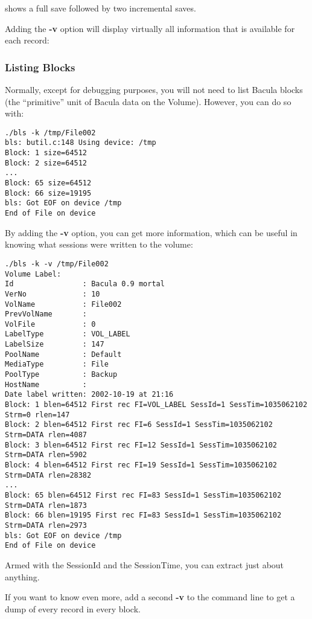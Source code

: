 shows a full save followed by two incremental saves. 

Adding the {\bf -v} option will display virtually all information that is
available for each record: 

\subsubsection*{Listing Blocks}

Normally, except for debugging purposes, you will not need to list Bacula
blocks (the ``primitive'' unit of Bacula data on the Volume). However, you can
do so with: 

\footnotesize
\begin{verbatim}
./bls -k /tmp/File002
bls: butil.c:148 Using device: /tmp
Block: 1 size=64512
Block: 2 size=64512
...
Block: 65 size=64512
Block: 66 size=19195
bls: Got EOF on device /tmp
End of File on device
\end{verbatim}
\normalsize

By adding the {\bf -v} option, you can get more information, which can be
useful in knowing what sessions were written to the volume: 

\footnotesize
\begin{verbatim}
./bls -k -v /tmp/File002
Volume Label:
Id                : Bacula 0.9 mortal
VerNo             : 10
VolName           : File002
PrevVolName       :
VolFile           : 0
LabelType         : VOL_LABEL
LabelSize         : 147
PoolName          : Default
MediaType         : File
PoolType          : Backup
HostName          :
Date label written: 2002-10-19 at 21:16
Block: 1 blen=64512 First rec FI=VOL_LABEL SessId=1 SessTim=1035062102 Strm=0 rlen=147
Block: 2 blen=64512 First rec FI=6 SessId=1 SessTim=1035062102 Strm=DATA rlen=4087
Block: 3 blen=64512 First rec FI=12 SessId=1 SessTim=1035062102 Strm=DATA rlen=5902
Block: 4 blen=64512 First rec FI=19 SessId=1 SessTim=1035062102 Strm=DATA rlen=28382
...
Block: 65 blen=64512 First rec FI=83 SessId=1 SessTim=1035062102 Strm=DATA rlen=1873
Block: 66 blen=19195 First rec FI=83 SessId=1 SessTim=1035062102 Strm=DATA rlen=2973
bls: Got EOF on device /tmp
End of File on device
\end{verbatim}
\normalsize

Armed with the SessionId and the SessionTime, you can extract just about
anything. 

If you want to know even more, add a second {\bf -v} to the command line to
get a dump of every record in every block. 

